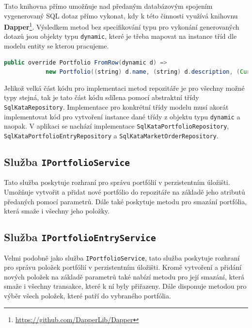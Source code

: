 \documentclass[12pt, a4paper]{article}
\begin{document}
    Tato knihovna přímo umožňuje nad předaným databázovým spojením vygenerovaný SQL dotaz přímo vykonat, kdy k této činnosti využívá knihovnu \textbf{Dapper}\footnote{\url{https://github.com/DapperLib/Dapper}}.
    Výsledkem metod bez specifikování typu pro vykonání generovaných dotazů jsou objekty typu \texttt{dynamic}, které je třeba mapovat na instance tříd dle modelu entity se kterou pracujeme.

    \begin{lstlisting}[language=Java,caption={Příklad mapování objektu typu \texttt{dynamic} na instanci třídy \texttt{Portfolio}.},captionpos=b, label={lst:sm-mapping}]
public override Portfolio FromRow(dynamic d) =>
            new Portfolio((string) d.name, (string) d.description, (Currency) d.currency_code, (int) d.id);
    \end{lstlisting}

    Jelikož velká část kódu pro implementaci metod repozitáře je pro všechny možné typy stejná, tak je tato část kódu sdílena pomocí abstraktní třídy \texttt{SqlKataRepository}. Implementace pro konkrétní třídy modelu musí akorát implementovat kód pro vytvoření instance dané třídy z objektu typu \texttt{dynamic} a naopak. V aplikaci se nachází implementace \texttt{SqlKataPortfolioRepository}, \texttt{SqlKataPortfolioEntryRepository} a \texttt{SqlKataMarketOrderRepository}.
    
    \subsection{Služba \texttt{IPortfolioService}}
    Tato služba poskytuje rozhraní pro správu portfólií v perzistentním úložišti.
    Umožňuje vytvořit a přidat nové portfólio do repozitáře na základě jeho atributů předaných pomocí parametrů.
    Dále také poskytuje metodu pro smazání portfólia, která smaže i všechny jeho položky.
    
    \subsection{Služba \texttt{IPortfolioEntryService}}
    Velmi podobně jako služba \texttt{IPortfolioService}, tato služba poskytuje rozhraní pro správu položek portfólií v perzistentním úložišti.
    Kromě vytvoření a přidání nových položek na základě parametrů také nabízí metodu pro její smazání, která smaže i všechny transakce, které k ní byly přiřazeny. 
    Dále disponuje metodou pro výběr všech položek, které patří do vybraného portfólia.
    
\end{document}
